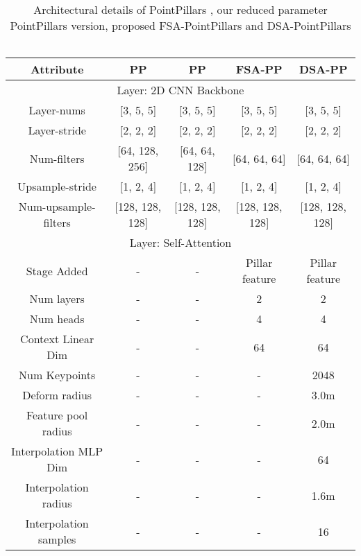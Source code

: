 \documentclass[10pt,twocolumn,letterpaper]{article}
\begin{document}
\begin{table*}[t]
    \centering
    \begin{tabular*}{\textwidth}{|c||c|c|c|c|}
        \hline
        Attribute & PP \cite{pointpillars} & PP & FSA-PP & DSA-PP \\
        \hline
        \hline
         \multicolumn{5}{|c|}{Layer: 2D CNN Backbone}  \\
        \hline
         Layer-nums & [3, 5, 5] & [3, 5, 5] & [3, 5, 5] & [3, 5, 5]\\
         \hline
         Layer-stride & [2, 2, 2] & [2, 2, 2] & [2, 2, 2] & [2, 2, 2] \\
         \hline
         Num-filters & [64, 128, 256] & [64, 64, 128] & [64, 64, 64] & [64, 64, 64] \\
         \hline
         Upsample-stride & [1, 2, 4] & [1, 2, 4] & [1, 2, 4] & [1, 2, 4] \\
         \hline
         Num-upsample-filters & [128, 128, 128] & [128, 128, 128] & [128, 128, 128] & [128, 128, 128] \\
         \hline
         \hline
        \multicolumn{5}{|c|}{Layer: Self-Attention}  \\
        \hline
        \hline
         Stage Added & - & - & Pillar feature & Pillar feature \\
         \hline
          Num layers & - & - & 2 & 2 \\
         \hline
          Num heads & - & - & 4 & 4 \\
         \hline
         Context Linear Dim & - & - & 64 & 64 \\
         \hline
         Num Keypoints & - & - & - & 2048 \\
         \hline
         Deform radius & - & - & - & 3.0m \\
         \hline
         Feature pool radius & - & - & - & 2.0m \\
         \hline
         Interpolation MLP Dim & - & - & - & 64 \\
         \hline
         Interpolation radius & - & - & - & 1.6m \\
         \hline
         Interpolation samples & - & - & - & 16 \\
         \hline
         
    \end{tabular*}
    \caption{Architectural details of PointPillars \cite{pointpillars}, our reduced parameter PointPillars version, proposed FSA-PointPillars and DSA-PointPillars \\ \\}
    \label{tab:pointpillar_archi}
\end{table*} \setlength{\tabcolsep}{13.8pt}
\end{document}
